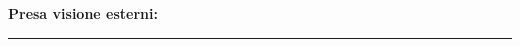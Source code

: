 \vspace*{\fill}
\begin{flushright}
    \textbf{Presa visione esterni:}

    \vspace{1.5cm}
    \rule{7cm}{0.4pt}
\end{flushright}